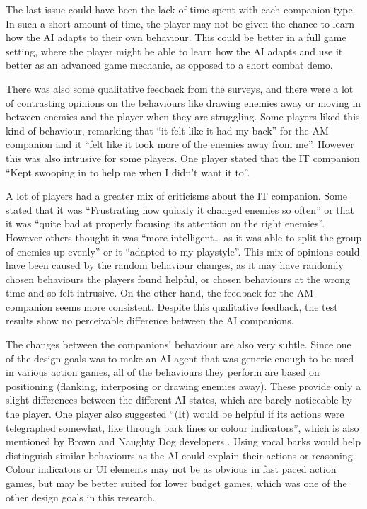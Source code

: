 \documentclass{IEEEtran}
\begin{document}
The last issue could have been the lack of time spent with each companion type. In such a short amount of time, the player may not be given the chance to learn how the AI adapts to their own behaviour. This could be better in a full game setting, where the player might be able to learn how the AI adapts and use it better as an advanced game mechanic, as opposed to a short combat demo.


There was also some qualitative feedback from the surveys, and there were a lot of contrasting opinions on the behaviours like drawing enemies away or moving in between enemies and the player when they are struggling. Some players liked this kind of behaviour, remarking that “it felt like it had my back” for the AM companion and it “felt like it took more of the enemies away from me”. However this was also intrusive for some players. One player stated that the IT companion “Kept swooping in to help me when I didn’t want it to”. 

A lot of players had a greater mix of criticisms about the IT companion. Some stated that it was “Frustrating how quickly it changed enemies so often” or that it was “quite bad at properly focusing its attention on the right enemies”. However others thought it was “more intelligent… as it was able to split the group of enemies up evenly” or it “adapted to my playstyle”. This mix of opinions could have been caused by the random behaviour changes, as it may have randomly chosen behaviours the players found helpful, or chosen behaviours at the wrong time and so felt intrusive. On the other hand, the feedback for the AM companion seems more consistent. Despite this qualitative feedback, the test results show no perceivable difference between the AI companions.


The changes between the companions’ behaviour are also very subtle. Since one of the design goals was to make an AI agent that was generic enough to be used in various action games, all of the behaviours they perform are based on positioning (flanking, interposing or drawing enemies away). These provide only a slight differences between the different AI states, which are barely noticeable by the player. One player also suggested “(It) would be helpful if its actions were telegraphed somewhat, like through bark lines or colour indicators”, which is also mentioned by Brown and Naughty Dog developers \cite{GMTGoodAI, GAIP2EllieAI}. Using vocal barks would help distinguish similar behaviours as the AI could explain their actions or reasoning. Colour indicators or UI elements may not be as obvious in fast paced action games, but may be better suited for lower budget games, which was one of the other design goals in this research.
\end{document}
